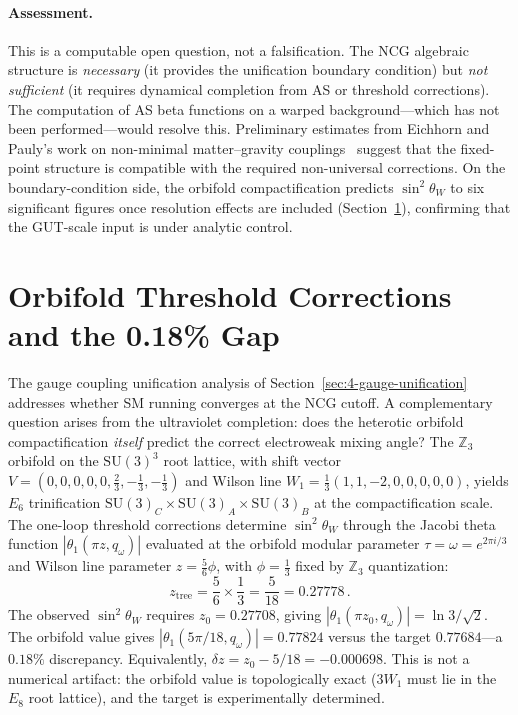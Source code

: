 \paragraph{Assessment.}
This is a computable open question, not a falsification.  The NCG algebraic structure is \emph{necessary} (it provides the unification boundary condition) but \emph{not sufficient} (it requires dynamical completion from AS or threshold corrections).  The computation of AS beta functions on a warped background---which has not been performed---would resolve this.  Preliminary estimates from Eichhorn and Pauly's work on non-minimal matter--gravity couplings~\cite{ch4:EichhornPauly2021} suggest that the fixed-point structure is compatible with the required non-universal corrections.  On the boundary-condition side, the orbifold compactification predicts $\sin^2\theta_W$ to six significant figures once resolution effects are included (Section~\ref{sec:4-gap-resolution}), confirming that the GUT-scale input is under analytic control.


\section{Orbifold Threshold Corrections and the 0.18\% Gap}
\label{sec:4-gap-resolution}

The gauge coupling unification analysis of Section~\ref{sec:4-gauge-unification} addresses whether SM running converges at the NCG cutoff.  A complementary question arises from the ultraviolet completion: does the heterotic orbifold compactification \emph{itself} predict the correct electroweak mixing angle?  The $\mathbb{Z}_3$ orbifold on the $\mathrm{SU}(3)^3$ root lattice, with shift vector $V = (0,0,0,0,0,\tfrac{2}{3},-\tfrac{1}{3},-\tfrac{1}{3})$ and Wilson line $W_1 = \tfrac{1}{3}(1,1,-2,0,0,0,0,0)$, yields $E_6$ trinification $\mathrm{SU}(3)_C \times \mathrm{SU}(3)_A \times \mathrm{SU}(3)_B$ at the compactification scale.  The one-loop threshold corrections determine $\sin^2\theta_W$ through the Jacobi theta function $|\theta_1(\pi z, q_\omega)|$ evaluated at the orbifold modular parameter $\tau = \omega = e^{2\pi i/3}$ and Wilson line parameter $z = \tfrac{5}{6}\phi$, with $\phi = \tfrac{1}{3}$ fixed by $\mathbb{Z}_3$ quantization:
\begin{equation}
  z_{\mathrm{tree}} = \frac{5}{6} \times \frac{1}{3} = \frac{5}{18} = 0.27778\,.
  \label{eq:4-gap-ztree}
\end{equation}
The observed $\sin^2\theta_W$ requires $z_0 = 0.27708$, giving $|\theta_1(\pi z_0, q_\omega)| = \ln 3/\sqrt{2}$.  The orbifold value gives $|\theta_1(5\pi/18, q_\omega)| = 0.77824$ versus the target $0.77684$---a $0.18\%$ discrepancy.  Equivalently, $\delta z = z_0 - 5/18 = -0.000698$.  This is not a numerical artifact: the orbifold value is topologically exact ($3W_1$ must lie in the $E_8$ root lattice), and the target is experimentally determined.


